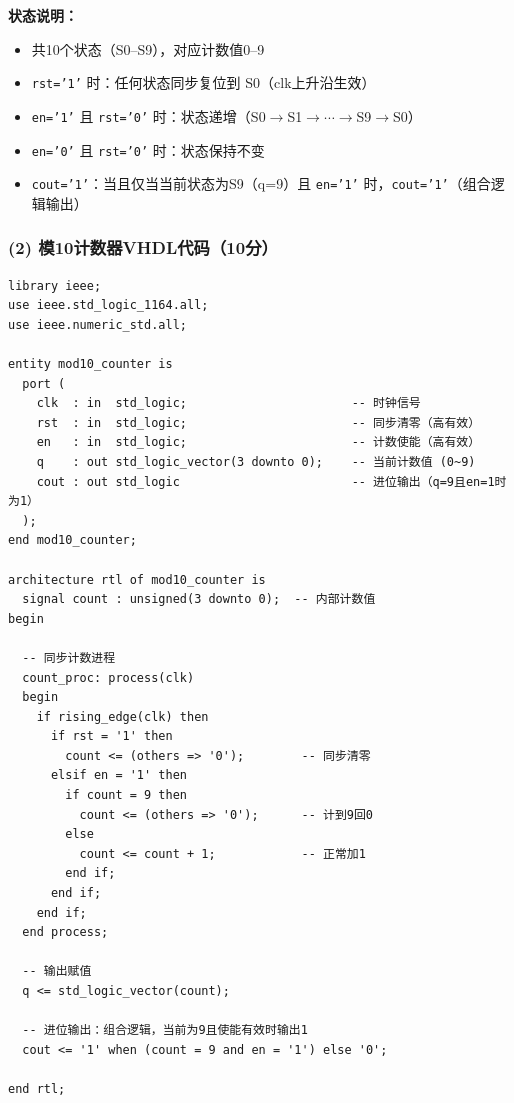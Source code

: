 \noindent\textbf{状态说明：}
\begin{itemize}
  \item 共10个状态（S0--S9），对应计数值0--9
  \item \texttt{rst='1'} 时：任何状态同步复位到 S0（clk上升沿生效）
  \item \texttt{en='1'} 且 \texttt{rst='0'} 时：状态递增（S0$\rightarrow$S1$\rightarrow\cdots\rightarrow$S9$\rightarrow$S0）
  \item \texttt{en='0'} 且 \texttt{rst='0'} 时：状态保持不变
  \item \texttt{cout='1'}：当且仅当当前状态为S9（q=9）且 \texttt{en='1'} 时，\texttt{cout='1'}（组合逻辑输出）
\end{itemize}

\subsubsection*{(2) 模10计数器VHDL代码（10分）}

\begin{lstlisting}[caption={模10计数器——完整VHDL代码}, label={lst:ans04_mod10}]
library ieee;
use ieee.std_logic_1164.all;
use ieee.numeric_std.all;

entity mod10_counter is
  port (
    clk  : in  std_logic;                       -- 时钟信号
    rst  : in  std_logic;                       -- 同步清零（高有效）
    en   : in  std_logic;                       -- 计数使能（高有效）
    q    : out std_logic_vector(3 downto 0);    -- 当前计数值 (0~9)
    cout : out std_logic                        -- 进位输出（q=9且en=1时为1）
  );
end mod10_counter;

architecture rtl of mod10_counter is
  signal count : unsigned(3 downto 0);  -- 内部计数值
begin

  -- 同步计数进程
  count_proc: process(clk)
  begin
    if rising_edge(clk) then
      if rst = '1' then
        count <= (others => '0');        -- 同步清零
      elsif en = '1' then
        if count = 9 then
          count <= (others => '0');      -- 计到9回0
        else
          count <= count + 1;            -- 正常加1
        end if;
      end if;
    end if;
  end process;

  -- 输出赋值
  q <= std_logic_vector(count);

  -- 进位输出：组合逻辑，当前为9且使能有效时输出1
  cout <= '1' when (count = 9 and en = '1') else '0';

end rtl;
\end{lstlisting}

